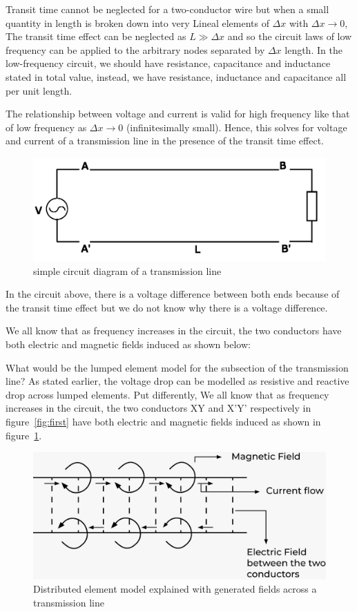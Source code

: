 Transit time cannot be neglected for a two-conductor wire but when a small quantity in length is broken down into very Lineal elements of $ \Delta x $ with  $  \Delta x \rightarrow 0 $, The transit time effect can be neglected as $ L \gg \Delta x $ and so the circuit laws of low frequency can be applied to the arbitrary nodes separated by $ \Delta x $ length. In the low-frequency circuit, we should have resistance, capacitance and inductance stated in total value, instead, we have resistance, inductance and capacitance all per unit length.

The relationship between voltage and current is valid for high frequency like that of low frequency as $ \Delta x  \rightarrow 0$ (infinitesimally small). Hence, this solves for voltage and current of a transmission line in the presence of the transit time effect.
\begin{figure}[h]
\centering
\includegraphics[width=1\linewidth]{graphics/second fixed}
\caption{simple circuit diagram of a transmission line}
\end{figure}	

In the circuit above, there is a voltage difference between both ends because of the transit time effect but we do not know why there is a voltage difference.

We all know that as frequency increases in the circuit, the two conductors have both electric and magnetic fields induced as shown below: 

What would be the lumped element model for the subsection of the transmission line? As stated earlier, the voltage drop can be modelled as resistive and reactive drop across lumped elements. Put differently, We all know that as frequency increases in the circuit, the two conductors XY and X'Y' respectively in figure~\ref{fig:first} have both electric and magnetic fields induced as shown in figure~\ref{fig:third}.
\begin{figure}[h]
\centering
\includegraphics[width=1\linewidth]{graphics/fieldsTx}
\caption{Distributed element model explained with generated fields across a transmission line}
\label{fig:third}
\end{figure}


